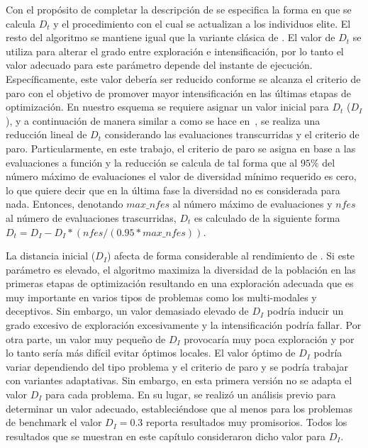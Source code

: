 Con el propósito de completar la descripción de \DEEDM{} se especifica la forma en que se calcula $D_t$ y el procedimiento con el cual se actualizan a los individuos elite.
%
El resto del algoritmo se mantiene igual que la variante clásica de \DE{}.
%
El valor de $D_t$ se utiliza para alterar el grado entre exploración e intensificación, por lo tanto el valor adecuado para este parámetro depende del
instante de ejecución.
%
Específicamente, este valor debería ser reducido conforme se alcanza el criterio de paro con el objetivo de promover mayor intensificación 
en las últimas etapas de optimización.
%
En nuestro esquema se requiere asignar un valor inicial para $D_t$ ($D_I$), y a continuación de manera similar a como se hace en~\cite{segura2016novel}, 
se realiza una reducción lineal de $D_t$ considerando las evaluaciones transcurridas y el criterio de paro.
%
Particularmente, en este trabajo, el criterio de paro se asigna en base a las evaluaciones a función
y la reducción se calcula de tal forma que al $95\%$ del número máximo de evaluaciones el valor de diversidad mínimo requerido es cero,
lo que quiere decir que en la última fase la diversidad no es considerada para nada.
%
Entonces, denotando $max\_nfes$ al número máximo de evaluaciones y $nfes$ al número de evaluaciones trascurridas, $D_t$ es calculado de la siguiente 
forma $D_t=D_I - D_I *(nfes/(0.95*max\_nfes))$.

La distancia inicial ($D_I$) afecta de forma considerable al rendimiento de \DEEDM{}.
%
Si este parámetro es elevado, el algoritmo maximiza la diversidad de la población en las primeras etapas de optimización resultando en una exploración adecuada 
que es muy importante en varios tipos de problemas como los multi-modales y deceptivos.
%
Sin embargo, un valor demasiado elevado de $D_I$ podría inducir un grado excesivo de exploración excesivamente y la intensificación podría fallar.
%
Por otra parte, un valor muy pequeño de $D_I$ provocaría muy poca exploración y por lo tanto sería más difícil evitar óptimos locales.
%
El valor óptimo de $D_I$ podría variar dependiendo del tipo problema y el criterio de paro y se podría trabajar con variantes adaptativas.
%
Sin embargo, en esta primera versión no se adapta el valor $D_I$ para cada problema.
%
En su lugar, se realizó un análisis previo para determinar un valor adecuado, estableciéndose que al menos para los problemas de benchmark
el valor $D_I = 0.3$ reporta resultados muy promisorios.
%
Todos los resultados que se muestran en este capítulo consideraron dicho valor para $D_I$.


